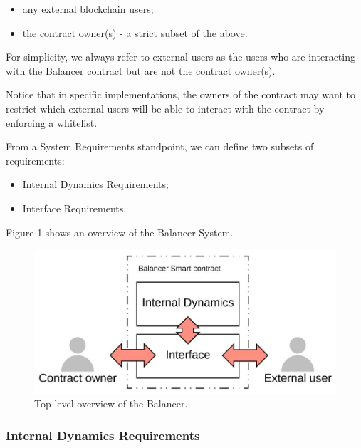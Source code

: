 \documentclass[11pt]{amsart}
\begin{document}
\begin{itemize}
    \item any external blockchain users;
    \item the contract owner(s) - a strict subset of the above.
\end{itemize}

For simplicity, we always refer to external users as the users who are interacting with the Balancer contract but are not the contract owner(s).

Notice that in specific implementations, the owners of the contract may want to restrict which external users will be able to interact with the contract by enforcing a whitelist.

From a System Requirements standpoint, we can define two subsets of requirements: 

\begin{itemize}
    \item Internal Dynamics Requirements;
    \item Interface Requirements.
\end{itemize}

Figure 1 shows an overview of the Balancer System.

\begin{figure}
  \includegraphics[]{overview}
  \caption{Top-level overview of the Balancer.}
  \label{fig:overview}
\end{figure}

\subsubsection{Internal Dynamics Requirements}
\end{document}
